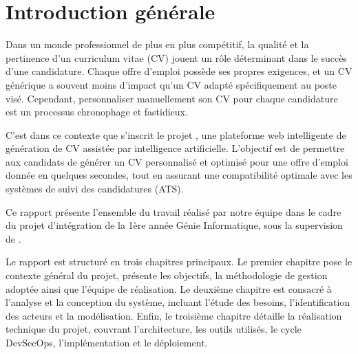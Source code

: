 \chapter{Introduction générale}
\label{chap:introduction}

Dans un monde professionnel de plus en plus compétitif, la qualité et la pertinence d'un curriculum vitae (CV) jouent un rôle déterminant dans le succès d'une candidature. Chaque offre d'emploi possède ses propres exigences, et un CV générique a souvent moins d'impact qu'un CV adapté spécifiquement au poste visé. Cependant, personnaliser manuellement son CV pour chaque candidature est un processus chronophage et fastidieux.

C'est dans ce contexte que s'inscrit le projet \projectname{}, une plateforme web intelligente de génération de CV assistée par intelligence artificielle. L'objectif est de permettre aux candidats de générer un CV personnalisé et optimisé pour une offre d'emploi donnée en quelques secondes, tout en assurant une compatibilité optimale avec les systèmes de suivi des candidatures (ATS).

Ce rapport présente l'ensemble du travail réalisé par notre équipe dans le cadre du projet d'intégration de la 1ère année Génie Informatique, sous la supervision de \professeur.

Le rapport est structuré en trois chapitres principaux. Le premier chapitre pose le contexte général du projet, présente les objectifs, la méthodologie de gestion adoptée ainsi que l'équipe de réalisation. Le deuxième chapitre est consacré à l'analyse et la conception du système, incluant l'étude des besoins, l'identification des acteurs et la modélisation. Enfin, le troisième chapitre détaille la réalisation technique du projet, couvrant l'architecture, les outils utilisés, le cycle DevSecOps, l'implémentation et le déploiement.
